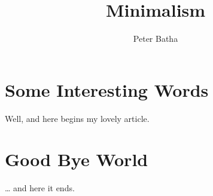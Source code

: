 \documentclass[a4paper,11pt]{article}
\author{Peter Batha}
\title{Minimalism}
\begin{document}
\maketitle
\tableofcontents
\section{Some Interesting Words}
Well, and here begins my lovely article.
\section{Good Bye World}
\ldots{} and here it ends.
\end{document}
